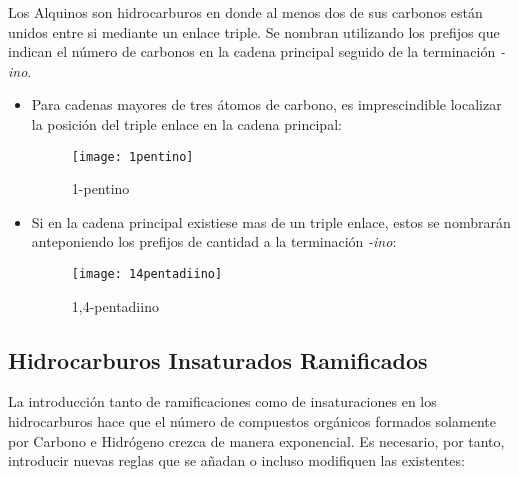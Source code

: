 Los Alquinos son hidrocarburos en donde al menos dos de sus carbonos están unidos entre si mediante un enlace triple. Se nombran utilizando los prefijos que indican el número de carbonos en la cadena principal seguido de la terminación \emph{-ino}.
\begin{itemize}
	
\begin{figure}[h!]
	\centering
	\texttt{[image: etino]}
	\captionsetup{labelformat=empty}
	\caption{Etino (también llamado comúnmente \emph{Acetileno})}
\end{figure}
	\item Para cadenas mayores de tres átomos de carbono, es imprescindible localizar la posición del triple enlace en la cadena principal:

\begin{figure}[h!]
	\centering
	\texttt{[image: 1pentino]}
	\captionsetup{labelformat=empty}
	\caption{1-pentino}
\end{figure}

	\item Si en la cadena principal existiese mas de un triple enlace, estos se nombrarán anteponiendo los prefijos de cantidad a la terminación \emph{-ino}:

\begin{figure}[h!]
	\centering
	\texttt{[image: 14pentadiino]}
	\captionsetup{labelformat=empty}
	\caption{1,4-pentadiino}
\end{figure}
\end{itemize}
\subsection{Hidrocarburos Insaturados Ramificados}

La introducción tanto de ramificaciones como de insaturaciones en los hidrocarburos hace que el número de compuestos orgánicos formados solamente por Carbono e Hidrógeno crezca de manera exponencial. Es necesario, por tanto, introducir nuevas reglas que se añadan o incluso modifiquen las existentes:\\


